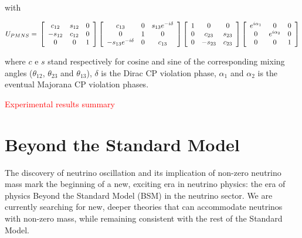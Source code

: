with

\begin{equation}
U_{PMNS}=\\
\left[ 
\begin{array}{ccc}
c_{12} & s_{12} & 0\\
-s_{12} & c_{12} & 0\\
0 & 0 & 1\\
\end{array}
\right]
\left[ 
\begin{array}{ccc}
c_{13} & 0 &s_{13}e^{-i\delta} \\
0 & 1 & 0\\
-s_{13}e^{-i\delta}& 0 & c_{13}\\
\end{array}
\right]
\left[
\begin{array}{ccc}
1 & 0 & 0\\
0 & c_{23} & s_{23} \\
0& -s_{23} & c_{23} \\
\end{array}
\right]
\left[ 
\begin{array}{ccc}
e^{i\alpha_1} & 0 & 0\\
0& e^{i\alpha_2} & 0\\
0 & 0 & 1\\
\end{array}
\right]
\end{equation}





where $c$ e $s$ stand respectively for cosine and sine of the corresponding  mixing angles ($\theta_{12}$, $\theta_{23}$ and $\theta_{13}$), $\delta$  is the Dirac CP violation phase, $\alpha_1$ and $\alpha_{2}$    is the eventual Majorana CP violation phases.

\textcolor{red}{Experimental results summary}

\section{Beyond the Standard Model}
The discovery of neutrino oscillation and its implication of non-zero neutrino mass mark  the beginning of a new, exciting era in neutrino physics: the era of physics Beyond the Standard Model (BSM) in the neutrino sector.
We are currently searching for new, deeper theories that can accommodate neutrinos with non-zero mass, while remaining consistent with the rest of the Standard Model. %

